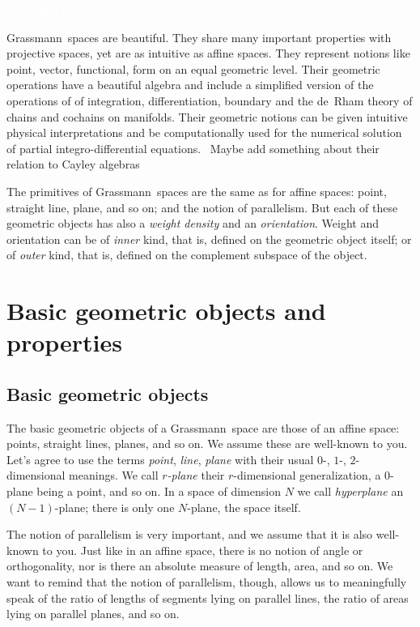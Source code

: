 \documentclass[\ifafour a4paper,12pt,\else a5paper,10pt,\fi%
onecolumn,oneside,article,%
british%
]{memoir}
\theoremstyle{remark}
\theoremstyle{innote}
\renewcommand*{\|}{\nonscript\,\vert\nonscript\;\mathopen{}}
\newcommand*{\puzzle}{{\fontencoding{U}\fontfamily{fontawesometwo}\selectfont\symbol{225}}}
\newcommand{\mynote}[1]{ {\color{notecolour}\puzzle\ #1}}
\newcommand*{\gm}{Grassmann}
\newcommand*{\yr}{r}
\newcommand*{\yN}{N}
\begin{document}
\textcolor{white}{If you find this you can claim a postcard from me.}

\gm\ spaces are beautiful. They share many important properties with
projective spaces, yet are as intuitive as affine spaces. They represent
notions like point, vector, functional, form on an equal geometric level.
Their geometric operations have a beautiful algebra and include a
simplified version of the operations of of integration, differentiation,
boundary and the de~Rham theory of chains and cochains on manifolds. Their
geometric notions can be given intuitive physical interpretations and be
computationally used for the numerical solution of partial
integro-differential equations. \mynote{Maybe add something about their
  relation to Cayley algebras}

The primitives of \gm\ spaces are the same as for affine spaces: point,
straight line, plane, and so on; and the notion of parallelism. But each of
these geometric objects has also a \emph{weight density} and an
\emph{orientation}. Weight and orientation can be of \emph{inner} kind,
that is, defined on the geometric object itself; or of \emph{outer} kind,
that is, defined on the complement subspace of the object.


\section{Basic geometric objects and properties}
\label{sec:basic_objects_properties}


\subsection{Basic geometric objects}
\label{sec:points_etc}

The basic geometric objects of a \gm\ space are those of an affine space:
points, straight lines, planes, and so on. We assume these are well-known
to you. Let's agree to use the terms \emph{point}, \emph{line},
\emph{plane} with their usual $0$-, $1$-, $2$-dimensional meanings. We call
\emph{$\yr$-plane} their $\yr$-dimensional generalization, a $0$-plane
being a point, and so on. In a space of dimension $\yN$ we call
\emph{hyperplane} an $(\yN-1)$-plane; there is only one $\yN$-plane, the
space itself.

The notion of parallelism is very important, and we assume that it is also
well-known to you. Just like in an affine space, there is no notion of
angle or orthogonality, nor is there an absolute measure of length, area,
and so on. We want to remind that the notion of parallelism, though, allows
us to meaningfully speak of the ratio of lengths of segments lying on
parallel lines, the ratio of areas lying on parallel planes, and so on.
\end{document}
